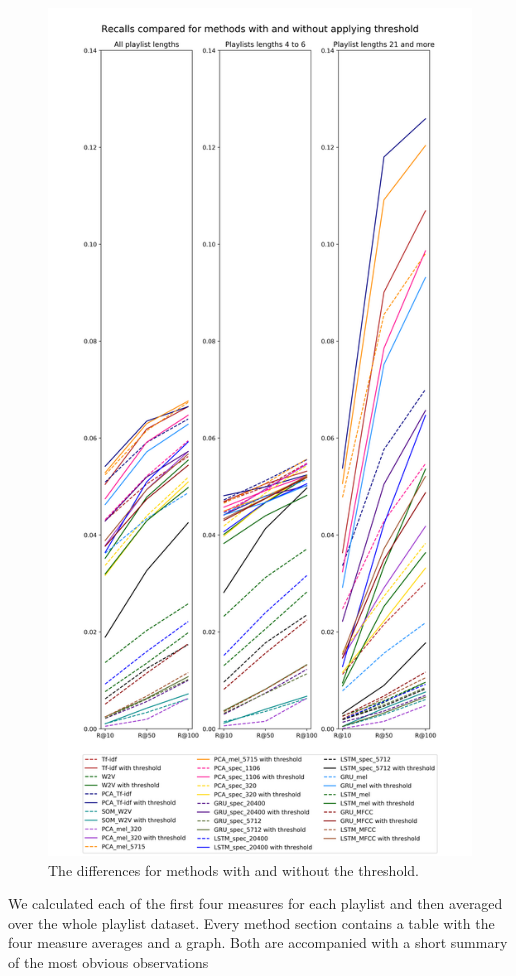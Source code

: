\begin{itemize}
\begin{figure}[hbt!]
    \centering
	\includegraphics[width=120mm]{./img/threshold_comparison.png}
	\caption{The differences for methods with and without the threshold.}
	\label{fig:method_comparison}
\end{figure}
    
\end{itemize}
We calculated each of the first four measures for each playlist and then averaged over the whole playlist dataset. Every method section contains a table with the four measure averages and a graph. Both are accompanied with a short summary of the most obvious observations

